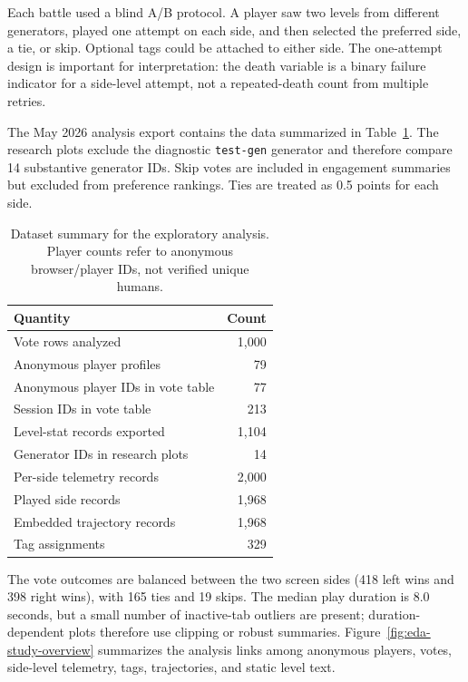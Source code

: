 \documentclass[11pt,a4paper]{article}
\theoremstyle{plain}
\theoremstyle{definition}
\theoremstyle{remark}
\begin{document}
Each battle used a blind A/B protocol. A player saw two levels from different generators, played one attempt on each side, and then selected the preferred side, a tie, or skip. Optional tags could be attached to either side. The one-attempt design is important for interpretation: the death variable is a binary failure indicator for a side-level attempt, not a repeated-death count from multiple retries.

The May 2026 analysis export contains the data summarized in Table~\ref{tab:eda-dataset-summary}. The research plots exclude the diagnostic \texttt{test-gen} generator and therefore compare 14 substantive generator IDs. Skip votes are included in engagement summaries but excluded from preference rankings. Ties are treated as 0.5 points for each side.

\begin{table}[H]
\centering
\caption{Dataset summary for the exploratory analysis. Player counts refer to anonymous browser/player IDs, not verified unique humans.}
\label{tab:eda-dataset-summary}
\begin{tabular}{lr}
\toprule
\textbf{Quantity} & \textbf{Count} \\
\midrule
Vote rows analyzed & 1,000 \\
Anonymous player profiles & 79 \\
Anonymous player IDs in vote table & 77 \\
Session IDs in vote table & 213 \\
Level-stat records exported & 1,104 \\
Generator IDs in research plots & 14 \\
Per-side telemetry records & 2,000 \\
Played side records & 1,968 \\
Embedded trajectory records & 1,968 \\
Tag assignments & 329 \\
\bottomrule
\end{tabular}
\end{table}

The vote outcomes are balanced between the two screen sides (418 left wins and 398 right wins), with 165 ties and 19 skips. The median play duration is 8.0 seconds, but a small number of inactive-tab outliers are present; duration-dependent plots therefore use clipping or robust summaries. Figure~\ref{fig:eda-study-overview} summarizes the analysis links among anonymous players, votes, side-level telemetry, tags, trajectories, and static level text.
\end{document}
